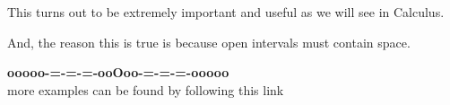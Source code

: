 \documentclass{ximera}
\begin{document}
This turns out to be extremely important and useful as we will see in Calculus.


And, the reason this is true is because open intervals must contain space.

































































\begin{onlineOnly}
\begin{center}
\textbf{\textcolor{green!50!black}{ooooo-=-=-=-ooOoo-=-=-=-ooooo}} \\

more examples can be found by following this link\\ 

\end{center}
\end{onlineOnly}
\end{document}
